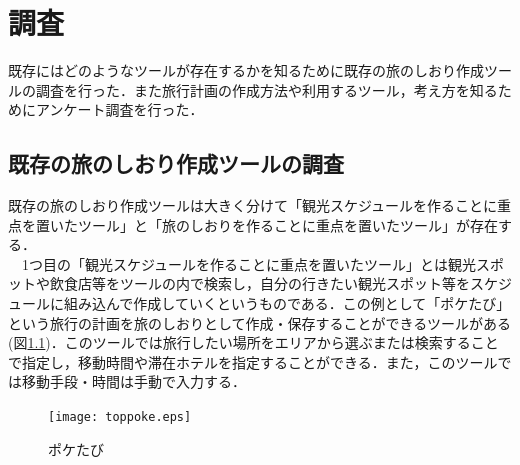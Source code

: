 \documentclass{funthesis}
\begin{document}






\chapter{調査}%

既存にはどのようなツールが存在するかを知るために既存の旅のしおり作成ツールの調査を行った．また旅行計画の作成方法や利用するツール，考え方を知るためにアンケート調査を行った．


\section{既存の旅のしおり作成ツールの調査}

既存の旅のしおり作成ツールは大きく分けて「観光スケジュールを作ることに重点を置いたツール」と「旅のしおりを作ることに重点を置いたツール」が存在する．\\
　1つ目の「観光スケジュールを作ることに重点を置いたツール」とは観光スポットや飲食店等をツールの内で検索し，自分の行きたい観光スポット等をスケジュールに組み込んで作成していくというものである．この例として「ポケたび」\cite{poketrip}という旅行の計画を旅のしおりとして作成・保存することができるツールがある(図\ref{Ltoppoke})．このツールでは旅行したい場所をエリアから選ぶまたは検索することで指定し，移動時間や滞在ホテルを指定することができる．また，このツールでは移動手段・時間は手動で入力する．

\begin{figure}[htpb]
\begin{center}
\texttt{[image: toppoke.eps]}
\end{center}
\caption{ポケたび}
\label{Ltoppoke}
\end{figure}
\end{document}
